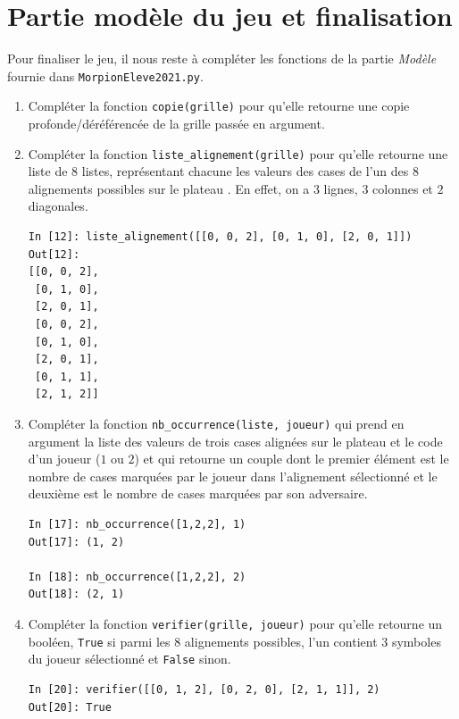 \documentclass[a4paper, french, 12pt]{article}  %
\newcounter{exo}
\newcounter{exoB}
\newenvironment{exerciceB2}
{\par \bigskip  \noindent \addtocounter{exoB}{1} \hrulefill \quad { \large \textbf{Exercice \theexoB}} \quad \hrulefill \par \medskip }
{\par \bigskip }
\begin{document}
\section{Partie modèle du jeu et finalisation}

Pour finaliser le jeu, il nous reste à compléter les fonctions de la partie \textit{Modèle} fournie dans \lstinline+MorpionEleve2021.py+.


\begin{exerciceB2}{}



\begin{enumerate}

     \item Compléter la fonction \lstinline+copie(grille)+ pour qu'elle retourne une copie profonde/déréférencée de la grille passée en argument.
     
	  \item Compléter la fonction \lstinline+liste_alignement(grille)+ pour qu'elle  retourne une liste de $8$ listes, représentant chacune les valeurs des cases de l'un des $8$ alignements possibles sur le plateau . En effet, on a $3$ lignes, $3$ colonnes et $2$ diagonales.

\begin{lstlisting}
In [12]: liste_alignement([[0, 0, 2], [0, 1, 0], [2, 0, 1]])
Out[12]: 
[[0, 0, 2],
 [0, 1, 0],
 [2, 0, 1],
 [0, 0, 2],
 [0, 1, 0],
 [2, 0, 1],
 [0, 1, 1],
 [2, 1, 2]]
\end{lstlisting}


\item Compléter la fonction  \lstinline+nb_occurrence(liste, joueur)+ qui prend en argument la liste des valeurs de trois cases alignées sur le plateau et le code d'un joueur ($1$ ou $2$) et qui retourne un couple dont le premier élément est le nombre de cases marquées par le joueur dans l'alignement sélectionné et le deuxième est   le nombre de cases marquées par son adversaire.

\begin{lstlisting}
In [17]: nb_occurrence([1,2,2], 1)
Out[17]: (1, 2)

In [18]: nb_occurrence([1,2,2], 2)
Out[18]: (2, 1)
\end{lstlisting}

\item Compléter la  fonction \lstinline+verifier(grille, joueur)+ pour qu'elle retourne un booléen, \lstinline+True+ si parmi les $8$ alignements possibles, l'un contient $3$ symboles du joueur sélectionné et \lstinline+False+ sinon.

\begin{lstlisting}
In [20]: verifier([[0, 1, 2], [0, 2, 0], [2, 1, 1]], 2)
Out[20]: True
\end{lstlisting}
\end{enumerate}

\end{exerciceB2}




 
\end{document}
